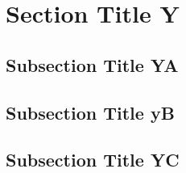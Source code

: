 
\clearpage
\section{Section Title Y}
\label{sec:section-y}


\subsection{Subsection Title YA}
\label{sec:subsection-ya}


\subsection{Subsection Title yB}
\label{sec:subsection-yb}


\subsection{Subsection Title YC}
\label{sec:subsection-Yc}


